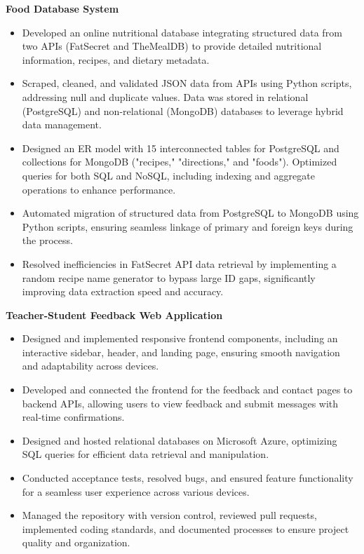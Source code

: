 \documentclass[10pt]{article}
\begin{document}
\textbf{Food Database System}
\vspace{-4mm}
\begin{itemize}[left=0.15in, itemsep=0pt, label=--]
    \item Developed an online nutritional database integrating structured data from two APIs (FatSecret and TheMealDB) to provide detailed nutritional information, recipes, and dietary metadata.
    \item Scraped, cleaned, and validated JSON data from APIs using Python scripts, addressing null and duplicate values. Data was stored in relational (PostgreSQL) and non-relational (MongoDB) databases to leverage hybrid data management.
    \item Designed an ER model with 15 interconnected tables for PostgreSQL and collections for MongoDB ("recipes," "directions," and "foods"). Optimized queries for both SQL and NoSQL, including indexing and aggregate operations to enhance performance.
    \item Automated migration of structured data from PostgreSQL to MongoDB using Python scripts, ensuring seamless linkage of primary and foreign keys during the process.
    \item Resolved inefficiencies in FatSecret API data retrieval by implementing a random recipe name generator to bypass large ID gaps, significantly improving data extraction speed and accuracy.
\end{itemize}

\textbf{Teacher-Student Feedback Web Application} 
\vspace{-4mm}
\begin{itemize}[left=0.15in, itemsep=0pt, label=--]
    \item Designed and implemented responsive frontend components, including an interactive sidebar, header, and landing page, ensuring smooth navigation and adaptability across devices.
    \item Developed and connected the frontend for the feedback and contact pages to backend APIs, allowing users to view feedback and submit messages with real-time confirmations.
    \item Designed and hosted relational databases on Microsoft Azure, optimizing SQL queries for efficient data retrieval and manipulation.
    \item Conducted acceptance tests, resolved bugs, and ensured feature functionality for a seamless user experience across various devices.
    \item Managed the repository with version control, reviewed pull requests, implemented coding standards, and documented processes to ensure project quality and organization.
\end{itemize}
\end{document}
